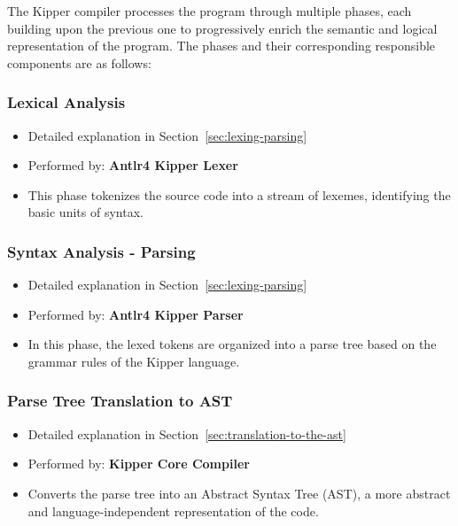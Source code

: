 The Kipper compiler processes the program through multiple phases, each building upon the previous one to progressively enrich the semantic and logical representation of the program. The phases and their corresponding responsible components are as follows:

\subsubsection{Lexical Analysis}
\begin{itemize}
	\item Detailed explanation in Section~\ref{sec:lexing-parsing}
	\item Performed by: \textbf{Antlr4 Kipper Lexer}
	\item This phase tokenizes the source code into a stream of lexemes, identifying the basic units of syntax.
\end{itemize}

\subsubsection{Syntax Analysis - Parsing}
\begin{itemize}
	\item Detailed explanation in Section~\ref{sec:lexing-parsing}
	\item Performed by: \textbf{Antlr4 Kipper Parser}
	\item In this phase, the lexed tokens are organized into a parse tree based on the grammar rules of the Kipper language.
\end{itemize}

\subsubsection{Parse Tree Translation to AST}
\begin{itemize}
	\item Detailed explanation in Section~\ref{sec:translation-to-the-ast}
	\item Performed by: \textbf{Kipper Core Compiler}
	\item Converts the parse tree into an Abstract Syntax Tree (AST), a more abstract and language-independent representation of the code.
\end{itemize}

